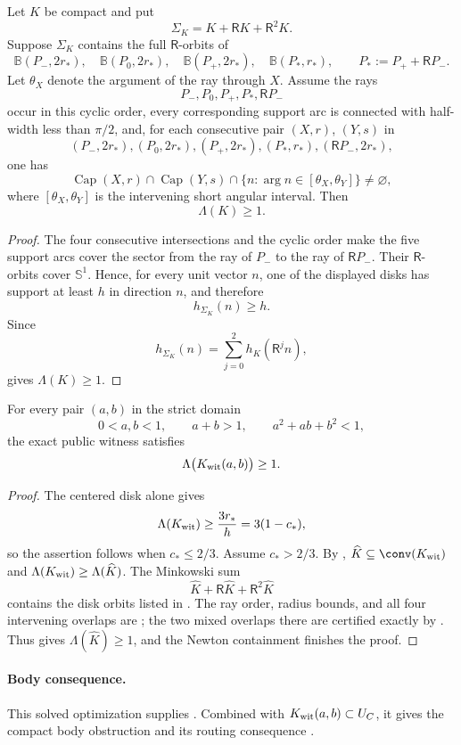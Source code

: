 \begin{lemma}
\label{lem:reader-cap-chain}
Let $K$ be compact and put
\[
 \Sigma_K=K+\mathsf RK+\mathsf R^2K.
\]
Suppose $\Sigma_K$ contains the full $\mathsf R$-orbits of
\[
 \mathbb B(P_-,2r_*),
 \quad
 \mathbb B(P_0,2r_*),
 \quad
 \mathbb B(P_+,2r_*),
 \quad
 \mathbb B(P_*,r_*),
 \qquad
 P_*:=P_++\mathsf R P_-.
\]
Let $\theta_X$ denote the argument of the ray through $X$.  Assume the rays
\[
 P_-,P_0,P_+,P_*,\mathsf R P_-
\]
occur in this cyclic order, every corresponding support arc is connected
with half-width less than $\pi/2$, and, for each consecutive pair $(X,r)$,
$(Y,s)$ in
\[
 (P_-,2r_*),
 (P_0,2r_*),
 (P_+,2r_*),
 (P_*,r_*),
 (\mathsf R P_-,2r_*),
\]
one has
\[
 \operatorname{Cap}(X,r)\cap\operatorname{Cap}(Y,s)
 \cap\{n:\arg n\in[\theta_X,\theta_Y]\}\ne\varnothing,
\]
where $[\theta_X,\theta_Y]$ is the intervening short angular interval.
Then
\[
 \Lambda(K)\ge1.
\]
\end{lemma}

\begin{proof}
The four consecutive intersections and the cyclic order make the five
support arcs cover the sector from the ray of $P_-$ to the ray of
$\mathsf R P_-$.  Their $\mathsf R$-orbits cover $\mathbb S^1$.  Hence, for
every unit vector $n$, one of the displayed disks has support at least $h$
in direction $n$, and therefore
\[
 h_{\Sigma_K}(n)\ge h.
\]
Since
\[
 h_{\Sigma_K}(n)=\sum_{j=0}^2h_K(\mathsf R^jn),
\]
 gives $\Lambda(K)\ge1$.
\end{proof}

\begin{theorem}
\label{thm:zero-gap-enclosure-optimization}
For every pair $(a,b)$ in the strict domain
\[
 0<a,b<1,
 \qquad a+b>1,
 \qquad a^2+ab+b^2<1,
\]
the exact public witness satisfies
\[
 \Lambda\bigl(K_{\rm wit}(a,b)\bigr)\ge1.
\]
\end{theorem}

\begin{proof}
The centered disk alone gives
\[
 \Lambda(K_{\rm wit})
 \ge\frac{3r_*}{h}
 =3(1-c_*),
\]
so the assertion follows when $c_*\le2/3$.  Assume $c_*>2/3$.
By ,
$\widehat K\subseteq\conv(K_{\rm wit})$ and
$\Lambda(K_{\rm wit})\ge\Lambda(\widehat K)$.  The Minkowski sum
\[
 \widehat K+\mathsf R\widehat K+\mathsf R^2\widehat K
\]
contains the disk orbits listed in .
The ray order, radius bounds, and all four intervening overlaps are
; the two mixed overlaps there are
certified exactly by .
Thus  gives $\Lambda(\widehat K)\ge1$, and the
Newton containment finishes the proof.
\end{proof}

\paragraph{Body consequence.}
This solved optimization supplies .
Combined with $K_{\rm wit}(a,b)\subset U_C$, it gives the compact body
obstruction  and its routing consequence
.

